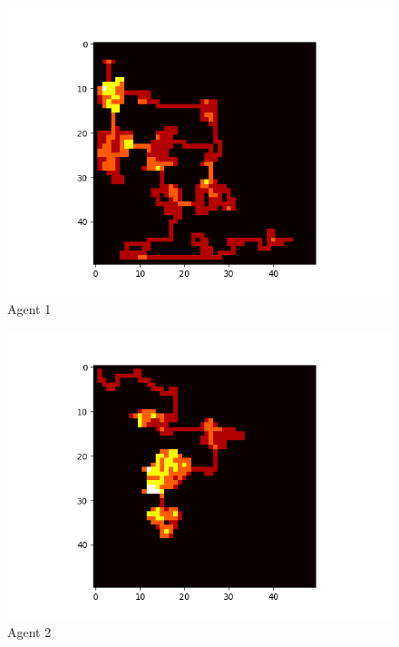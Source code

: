 \begin{figure}[!ht]
	\centering
	\includegraphics[scale=0.70]{images/test1_agent1.png}
	\caption{Agent 1}
	\label{fig:test1Agent1}
\end{figure}

\begin{figure}[!ht]
	\centering
	\includegraphics[scale=0.70]{images/test1_agent2.png}
	\caption{Agent 2}
	\label{fig:test1Agent2}
\end{figure}

